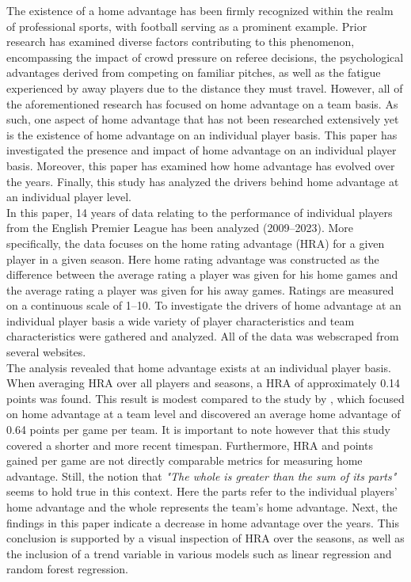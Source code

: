 The existence of a home advantage has been firmly recognized within the realm of professional sports, with football serving as a prominent example. Prior research has examined diverse factors contributing to this phenomenon, encompassing the impact of crowd pressure on referee decisions, the psychological advantages derived from competing on familiar pitches, as well as the fatigue experienced by away players due to the distance they must travel. However, all of the aforementioned research has focused on home advantage on a team basis. As such, one aspect of home advantage that has not been researched extensively yet is the existence of home advantage on an individual player basis. This paper has investigated the presence and impact of home advantage on an individual player basis. Moreover, this paper has examined how home advantage has evolved over the years. Finally, this study has analyzed the drivers behind home advantage at an individual player level. \\

\noindent
In this paper, 14 years of data relating to the performance of individual players from the English Premier League has been analyzed (2009--2023). More specifically, the data focuses on the home rating advantage (HRA) for a given player in a given season. Here home rating advantage was constructed as the difference between the average rating a player was given for his home games and the average rating a player was given for his away games. Ratings are measured on a continuous scale of 1--10. To investigate the drivers of home advantage at an individual player basis a wide variety of player characteristics and team characteristics were gathered and analyzed. All of the data was webscraped from several websites. \\

\noindent
The analysis revealed that home advantage exists at an individual player basis. When averaging HRA over all players and seasons, a HRA of approximately 0.14 points was found. This result is modest compared to the study by , which focused on home advantage at a team level and discovered an average home advantage of 0.64 points per game per team. It is important to note however that this study covered a shorter and more recent timespan. Furthermore, HRA and points gained per game are not directly comparable metrics for measuring home advantage. Still, the notion that \textit{"The whole is greater than the sum of its parts"} seems to hold true in this context. Here the parts refer to the individual players' home advantage and the whole represents the team's home advantage. Next, the findings in this paper indicate a decrease in home advantage over the years. This conclusion is supported by a visual inspection of HRA over the seasons, as well as the inclusion of a trend variable in various models such as linear regression and random forest regression. \\

